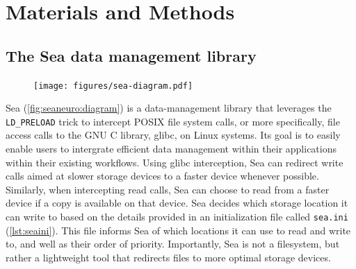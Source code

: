 \documentclass[pdflatex,sn-mathphys-num]{sn-jnl}
\theoremstyle{thmstyleone}%
\theoremstyle{thmstyletwo}%
\theoremstyle{thmstylethree}%
\begin{document}
    
    
    
    \section{Materials and Methods}


    \subsection{The Sea data management library}
    
\begin{figure}[t]

    \centering
    \texttt{[image: figures/sea-diagram.pdf]}%
    \captionsetup{justification=centering}
    \label{fig:seaneuro:diagram}
\end{figure}


    Sea (\autoref{fig:seaneuro:diagram}) is a data-management library that leverages
    the \texttt{LD\_PRELOAD}
    trick to intercept POSIX file system calls, or more specifically, file access calls to the GNU C library,
    glibc, on Linux systems. Its goal is to easily enable users to intergrate efficient data management within their
    applications within their existing workflows. Using glibc interception, Sea can redirect write calls
    aimed at slower storage devices to a faster device whenever possible.
    Similarly, when intercepting read calls, Sea can choose to read from a
    faster device if a copy is available on that device. Sea decides which
    storage location it can write to based on the details provided in an
    initialization file called \texttt{sea.ini} (\autoref{lst:seaini}). This file informs Sea of which
    locations it can use to read and write to, and well as their order of
    priority. Importantly, Sea is not a filesystem, but rather a
    lightweight tool that redirects files to more optimal storage devices.
\end{document}

